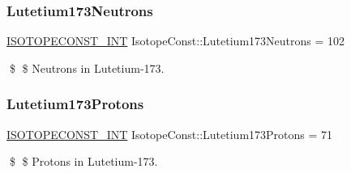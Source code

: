 \subsubsection{\texorpdfstring{Lutetium173\+Neutrons}{Lutetium173Neutrons}}
{\footnotesize\ttfamily \mbox{\hyperlink{group___isotope_const-_macros_ga5f18360b3e99483a35c32d789e62621c}{I\+S\+O\+T\+O\+P\+E\+C\+O\+N\+S\+T\+\_\+\+I\+NT}} Isotope\+Const\+::\+Lutetium173\+Neutrons = 102}

\$ \$ Neutrons in Lutetium-\/173. \mbox{\label{group___isotope_const-_lutetium-_lu173_gadf9de89198b5cea865c8f362b78ab02b}} 
\subsubsection{\texorpdfstring{Lutetium173\+Protons}{Lutetium173Protons}}
{\footnotesize\ttfamily \mbox{\hyperlink{group___isotope_const-_macros_ga5f18360b3e99483a35c32d789e62621c}{I\+S\+O\+T\+O\+P\+E\+C\+O\+N\+S\+T\+\_\+\+I\+NT}} Isotope\+Const\+::\+Lutetium173\+Protons = 71}

\$ \$ Protons in Lutetium-\/173. 